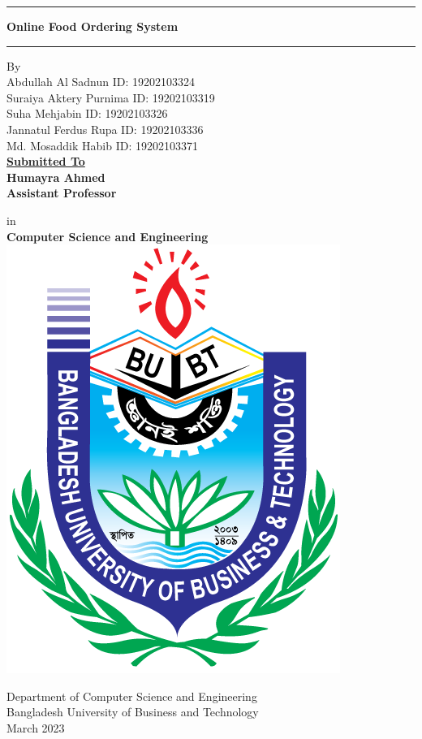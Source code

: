 
\begin{titlepage}
    \begin{center}
    \hrule
    \vspace{2mm}
     \large \textbf{Online Food Ordering System}
    \vspace{2mm}
    \hrule 
    \vspace{16mm}
    By\\
    Abdullah Al Sadnun \hspace{15mm} ID: 19202103324 \\
    Suraiya Aktery Purnima \hspace{14mm} ID: 19202103319 \\
        Suha Mehjabin \hspace{15mm} ID: 19202103326 \\
    Jannatul Ferdus Rupa \hspace{15mm} ID: 19202103336 \\
    Md. Mosaddik Habib \hspace{15mm} ID: 19202103371 \\
    
    \vspace{10mm}
    \large \textbf{\underline{Submitted To}\\ Humayra Ahmed\\Assistant Professor\\}
   
 in\\
\large \textbf{Computer Science and Engineering}\\
\vspace{15mm}
\includegraphics[scale=0.2]{BUBT-Logo.png}

\large Department of Computer Science and Engineering\\
\large Bangladesh University of Business and Technology\\
\vspace{10mm}
\large March 2023
    
    \end{center}
\end{titlepage}